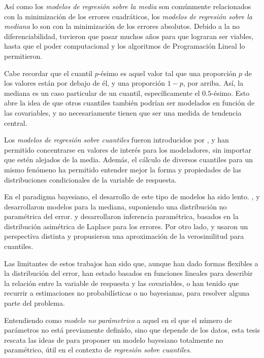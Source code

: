 As\'i como los \textit{modelos de regresi\'on sobre la media} son com\'unmente relacionados con la minimizaci\'on de los errores cuadr\'aticos, los \textit{modelos de regresi\'on sobre la mediana} lo son con la minimizaci\'on de los errores absolutos. Debido a la no diferenciabilidad, tuvieron que pasar muchos años para que lograran ser viables, hasta que el poder computacional y los algoritmos de Programaci\'on Lineal lo permitieron.

Cabe recordar que el cuantil $p$-\'esimo es aquel valor tal que una proporci\'on $p$ de los valores est\'an por debajo de \'el, y una proporci\'on $1-p$, por arriba. As\'i, la mediana es un caso particular de un cuantil, espec\'ificamente el $0.5$-\'esimo. Esto abre la idea de que otros cuantiles tambi\'en podr\'ian ser modelados en funci\'on de las covariables, y no necesariamente tienen que ser una medida de tendencia central. 

Los \textit{modelos de regresi\'on sobre cuantiles} fueron introducidos por \cite{Koenker_QuantReg}, y han permitido concentrarse en valores de inter\'es para los modeladores, sin importar que est\'en alejados de la media. Adem\'as, el c\'alculo de diversos cuantiles para un mismo fen\'omeno ha permitido entender mejor la forma y propiedades de las distribuciones condicionales de la variable de respuesta.

En el paradigma bayesiano, el desarrollo de este tipo de modelos ha sido lento. \cite{Walker_BayesAccFail}, \cite{Kottas_BaySemiparamMed} y \cite{Hanson_PolyaTrees} desarrollaron modelos para la mediana, suponiendo una distribuci\'on no param\'etrica del error. \cite{Yu_BayQuantReg} y \cite{Tsionas_BayQuantInf} desarrollaron inferencia param\'etrica, basados en la distribuci\'on asim\'etrica de Laplace para los errores. Por otro lado, \cite{Lavine_LikeQuant} y \cite{Dunson_ApproxBayes} usaron un perspectiva distinta y propusieron una aproximaci\'on de la verosimilitud para cuantiles.

Las limitantes de estos trabajos han sido que, aunque han dado formas flexibles a la distribuci\'on del error, han estado basados en funciones lineales para describir la relaci\'on entre la variable de respuesta y las covariables, o han tenido que recurrir a estimaciones no probabil\'isticas o no bayesianas, para resolver alguna parte del problema.

Entendiendo como \textit{modelo no par\'ametrico} a aquel en el que el n\'umero de par\'ametros no est\'a previamente definido, sino que depende de los datos, esta tesis rescata las ideas de \cite{Kottas_NotParamQuantReg} para proponer un modelo bayesiano totalmente no param\'etrico, \'util en el contexto de \textit{regresi\'on sobre cuantiles}.

\newpage